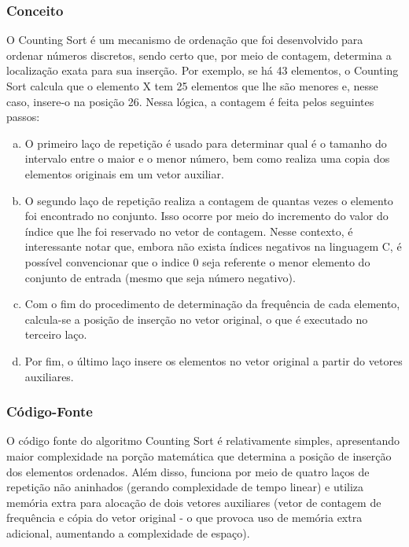 \documentclass[a4paper, 12pt]{article}
\begin{document}
\subsubsection{Conceito} 
\tab{} O Counting Sort é um mecanismo de ordenação que foi desenvolvido para ordenar números discretos, sendo certo que, por meio de contagem, determina a localização exata para sua inserção. Por exemplo, se há 43 elementos, o Counting Sort calcula que o elemento X tem 25 elementos que lhe são menores e, nesse caso, insere-o na posição 26. Nessa lógica, a contagem é feita pelos seguintes passos: 
\begin{enumerate}[a)]
    \item O primeiro laço de repetição é usado para determinar qual é o tamanho do intervalo entre o maior e o menor número, bem como realiza uma copia dos elementos originais em um vetor auxiliar. 
    \item O segundo laço de repetição realiza a contagem de quantas vezes o elemento foi encontrado no conjunto. Isso ocorre por meio do incremento do valor do índice que lhe foi reservado no vetor de contagem. Nesse contexto, é interessante notar que, embora não exista índices negativos na linguagem C, é possível convencionar que o indice 0 seja referente o menor elemento do conjunto de entrada (mesmo que seja número negativo).
    \item Com o fim do procedimento de determinação da frequência de cada elemento, calcula-se a posição de inserção no vetor original, o que é executado no terceiro laço.
    \item Por fim, o último laço insere os elementos no vetor original a partir do vetores auxiliares.
\end{enumerate}

\subsubsection{Código-Fonte} 
\tab{} O código fonte do algoritmo Counting Sort é relativamente simples, apresentando maior complexidade na porção matemática que determina a posição de inserção dos elementos ordenados. Além disso, funciona por meio de quatro laços de repetição não aninhados (gerando complexidade de tempo linear) e utiliza memória extra para alocação de dois vetores auxiliares (vetor de contagem de frequência e cópia do vetor original - o que provoca uso de memória extra adicional, aumentando a complexidade de espaço). 
\end{document}
